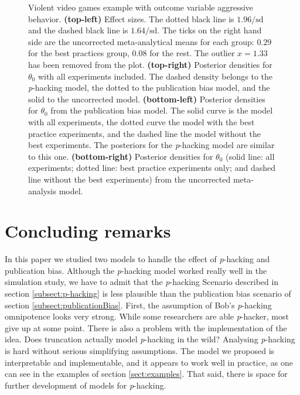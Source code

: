 \documentclass{article}
\theoremstyle{plain}
\theoremstyle{definition}
\begin{document}
\begin{figure}
\caption{\label{fig:anderson2010}Violent video games example with outcome variable aggressive behavior. \textbf{(top-left)} Effect sizes. The dotted black line is $1.96/\textrm{sd}$ and the dashed black line is $1.64/\textrm{sd}$. The ticks on the right hand side are the uncorrected meta-analytical means for each group: $0.29$ for the best practices group, $0.08$ for the rest. The outlier $x=1.33$ has been removed from the plot.
\textbf{(top-right)} Posterior densities for $\theta_{0}$ with all experiments included. The dashed density belongs to the \textit{p}-hacking model, the dotted to the publication bias model, and the solid to the uncorrected model. \textbf{(bottom-left)} Posterior densities for $\theta_{0}$ from the publication bias model. The solid curve is the model with all experiments, the dotted curve the model with the best practice experiments, and the dashed line the model without the best experiments. The posteriors for the \textit{p}-hacking model are similar to this one. \textbf{(bottom-right)} Posterior densities for $\theta_{0}$ (solid line: all experiments; dotted line: best practice experiments only; and dashed line without the best experiments) from the uncorrected meta-analysis model.}
\end{figure}

\section{Concluding remarks}\label{sect:conclusions}

In this paper we studied two models to handle the effect of \textit{p}-hacking and publication bias. Although the \textit{p}-hacking model worked really well in the simulation study, we have to admit that the \textit{p}-hacking Scenario described in section \ref{subsect:p-hacking} is less plausible than the publication bias scenario of section \ref{subsect:publicationBias}. First, the assumption of Bob's \textit{p}-hacking omnipotence looks very strong. While some researchers are able \textit{p}-hacker, most give up at some point. There is also a problem with the implementation of the idea. Does truncation actually model \textit{p}-hacking in the wild? Analysing \textit{p}-hacking is hard without serious simplifying assumptions. The model we proposed is interpretable and implementable, and it appears to work well in practice, as one can see in the examples of section \ref{sect:examples}. That said, there is space for further development of models for \textit{p}-hacking.
\end{document}
